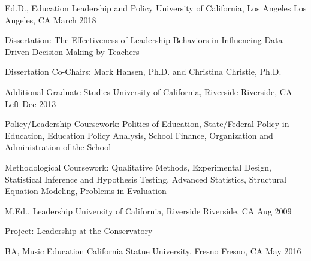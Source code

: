 

\begin{cventries}

  \cventry
    {Ed.D., Education Leadership and Policy} %
    {University of California, Los Angeles} %
    {Los Angeles, CA} %
    {March 2018} %
    {
      \begin{cvitems} %
        \item {Dissertation: The Effectiveness of Leadership Behaviors in Influencing Data-Driven Decision-Making by Teachers}
        \item {Dissertation Co-Chairs: Mark Hansen, Ph.D. and Christina Christie, Ph.D.        }
      \end{cvitems}
    }

  \cventry
    {Additional Graduate Studies} %
    {University of California, Riverside} %
    {Riverside, CA} %
    {Left Dec 2013} %
    {
      \begin{cvitems}
        \item Policy/Leadership Coursework: Politics of Education, State/Federal Policy in Education, Education Policy Analysis, School Finance, Organization and Administration of the School
        \item Methodological Coursework: Qualitative Methods, Experimental Design, Statistical Inference and Hypothesis Testing, Advanced Statistics, Structural Equation Modeling, Problems in Evaluation
      \end{cvitems}
    }

  \cventry
    {M.Ed., Leadership} %
    {University of California, Riverside} %
    {Riverside, CA} %
    {Aug 2009} %
    {
      \begin{cvitems} %
        \item {Project: Leadership at the Conservatory}
      \end{cvitems}
      }

  \cventry
    {BA, Music Education} %
    {California Statue University, Fresno} %
    {Fresno, CA} %
    {May 2016} %
    {
    }
  

\end{cventries}
